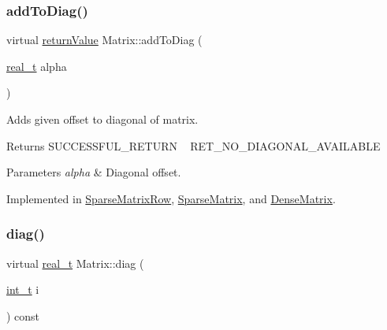 \subsubsection{\texorpdfstring{add\+To\+Diag()}{addToDiag()}}
{\footnotesize\ttfamily virtual \hyperlink{_message_handling_8hpp_a81d556f613bfbabd0b1f9488c0fa865e}{return\+Value} Matrix\+::add\+To\+Diag (\begin{DoxyParamCaption}\item[{\hyperlink{qp_o_a_s_e_s__wrapper_8h_a0d00e2b3dfadee81331bbb39068570c4}{real\+\_\+t}}]{alpha }\end{DoxyParamCaption})\hspace{0.3cm}{\ttfamily [pure virtual]}}

Adds given offset to diagonal of matrix. \begin{DoxyReturn}{Returns}
S\+U\+C\+C\+E\+S\+S\+F\+U\+L\+\_\+\+R\+E\+T\+U\+RN ~\newline
 R\+E\+T\+\_\+\+N\+O\+\_\+\+D\+I\+A\+G\+O\+N\+A\+L\+\_\+\+A\+V\+A\+I\+L\+A\+B\+LE 
\end{DoxyReturn}

\begin{DoxyParams}{Parameters}
{\em alpha} & Diagonal offset. \\
\hline
\end{DoxyParams}


Implemented in \hyperlink{class_sparse_matrix_row_a6feb397255c49e09d2cb25b2b5bef57d}{Sparse\+Matrix\+Row}, \hyperlink{class_sparse_matrix_a11500e9368167d4c0643fe0cebf2ccd6}{Sparse\+Matrix}, and \hyperlink{class_dense_matrix_ac901971278139a1413ff75d6106aa43b}{Dense\+Matrix}.

\mbox{\label{class_matrix_a8d76d428884fdb7a3deade8cad3c4b0a}} 
\subsubsection{\texorpdfstring{diag()}{diag()}}
{\footnotesize\ttfamily virtual \hyperlink{qp_o_a_s_e_s__wrapper_8h_a0d00e2b3dfadee81331bbb39068570c4}{real\+\_\+t} Matrix\+::diag (\begin{DoxyParamCaption}\item[{\hyperlink{_types_8hpp_ab6fd6105e64ed14a0c9281326f05e623}{int\+\_\+t}}]{i }\end{DoxyParamCaption}) const\hspace{0.3cm}{\ttfamily [pure virtual]}}

